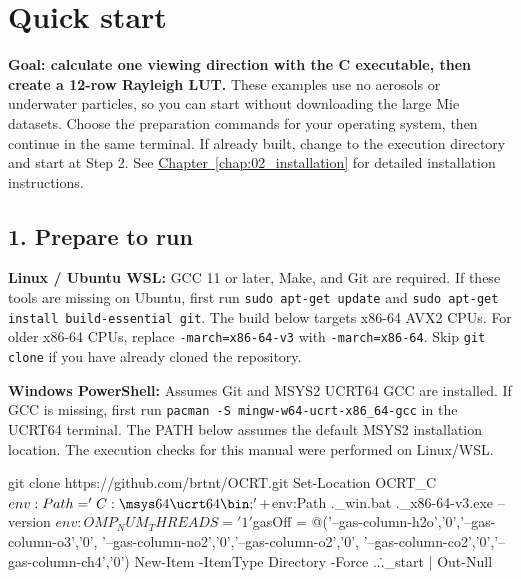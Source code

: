 \chapter*{Quick start}
\label{chap:quick_start}
\begingroup
\setlength{\parskip}{3pt}
\textbf{Goal: calculate one viewing direction with the C executable, then create a 12-row Rayleigh LUT.}
These examples use no aerosols or underwater particles, so you can start without downloading the large Mie datasets. Choose the preparation commands for your operating system, then continue in the same terminal. If already built, change to the execution directory and start at Step 2. See \hyperref[chap:02_installation]{Chapter~\ref*{chap:02_installation}} for detailed installation instructions.

\section*{1. Prepare to run}
\textbf{Linux / Ubuntu WSL:} GCC 11 or later, Make, and Git are required. If these tools are missing on Ubuntu, first run \texttt{sudo apt-get update} and \texttt{sudo apt-get install build-essential git}. The build below targets x86-64 AVX2 CPUs. For older x86-64 CPUs, replace \texttt{-march=x86-64-v3} with \texttt{-march=x86-64}. Skip \texttt{git clone} if you have already cloned the repository.


\textbf{Windows PowerShell:} Assumes Git and MSYS2 UCRT64 GCC are installed. If GCC is missing, first run \texttt{pacman -S mingw-w64-ucrt-x86\_64-gcc} in the UCRT64 terminal. The PATH below assumes the default MSYS2 installation location. The execution checks for this manual were performed on Linux/WSL.

\begin{ManualCode}
git clone https://github.com/brtnt/OCRT.git
Set-Location OCRT\code\OCRT_C
$env:Path = 'C:\bin;' + $env:Path
.\build_win.bat
.\build\ocrt_x86-64-v3.exe --version
$env:OMP_NUM_THREADS = '1'
$gasOff = @('--gas-column-h2o','0','--gas-column-o3','0',
  '--gas-column-no2','0','--gas-column-o2','0',
  '--gas-column-co2','0','--gas-column-ch4','0')
New-Item -ItemType Directory -Force ..\..\task\quick_start | Out-Null
\end{ManualCode}

